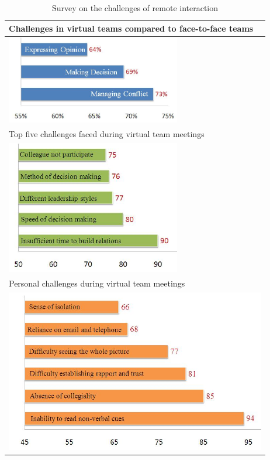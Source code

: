 \documentclass[oneside,11pt]{memoir}
\begin{document}
\begin{table}
\caption{Survey on the challenges of remote interaction \cite{solomon_challenges_2010}}
\label{Table:Tab3}
\begin{tabular}{|l|}
\hline
Challenges in virtual teams compared to face-to-face teams \\
\hline
\includegraphics[width=3in]{Suggestion1.jpg}\\
\hline
Top five challenges faced during virtual team meetings \\
\hline
\includegraphics[width=3in]{Suggestion2.jpg}\\
\hline
Personal challenges during virtual team meetings\\
\hline
\includegraphics[width=4.5in]{Suggestion3.jpg}\\
\hline
\end{tabular}
\end{table}
\end{document}
